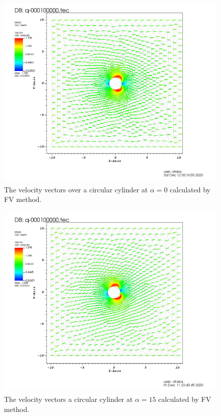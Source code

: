 \documentclass[letterpaper,12pt]{article}
\begin{document}
\begin{figure} [!h]
	\centering
	\includegraphics[height = 9.5cm]{graph/0deg/Cylinder_0angle_vector0000.png}
	\caption{The velocity vectors over a circular cylinder at $\alpha=0$ calculated by FV method.}
    \label{fig:q2v0}
\end{figure}

\begin{figure} [!h]
	\centering
	\includegraphics[height = 9.5cm]{graph/15deg/Cylinder_15angle_vector0000.png}
	\caption{The velocity vectors a circular cylinder at $\alpha=15$ calculated by FV method.}
    \label{fig:q2v15}
\end{figure}

\newpage
\end{document}
